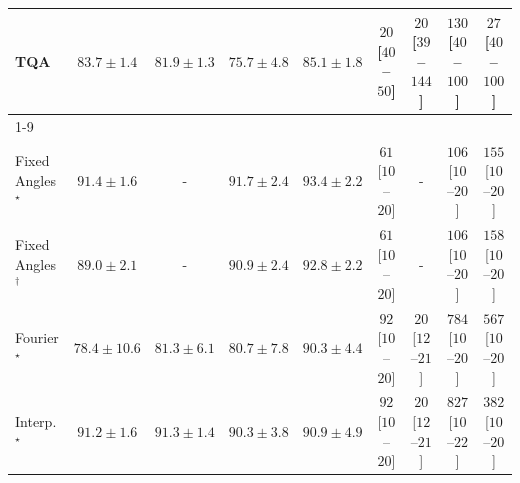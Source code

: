 \begin{tabular}{l|cccc|cccc|}
TQA & {\cellcolor[HTML]{1D7F41}} \color[HTML]{F1F1F1} $83.7\pm 1.4$ & {\cellcolor[HTML]{288A47}} \color[HTML]{F1F1F1} $81.9\pm 1.3$ & {\cellcolor[HTML]{53B466}} \color[HTML]{F1F1F1} $75.7\pm 4.8$ & {\cellcolor[HTML]{14783E}} \color[HTML]{F1F1F1} $85.1\pm 1.8$ & {\cellcolor[HTML]{FFF4F0}} \color[HTML]{000000} $20$ [$40$--$50$] & {\cellcolor[HTML]{FFF4F0}} \color[HTML]{000000} $20$ [$39$--$144$] & {\cellcolor[HTML]{FDDBD7}} \color[HTML]{000000} $130$ [$40$--$100$] & {\cellcolor[HTML]{FFF3EF}} \color[HTML]{000000} $27$ [$40$--$100$] \\
\cline{1-9}
\multicolumn{9}{c}{\rule{0pt}{8pt}SV} \\
\midrule
Fixed Angles$^\star$ & {\cellcolor[HTML]{03456C}} \color[HTML]{F1F1F1} $91.4\pm 1.6$ & {\cellcolor[HTML]{000000}} \color[HTML]{F1F1F1} {\cellcolor{white}} \color{black} - & {\cellcolor[HTML]{034369}} \color[HTML]{F1F1F1} $91.7\pm 2.4$ & {\cellcolor[HTML]{023858}} \color[HTML]{F1F1F1} $93.4\pm 2.2$ & {\cellcolor[HTML]{FEEBE8}} \color[HTML]{000000} $61$ [$10$--$20$] & {\cellcolor[HTML]{000000}} \color[HTML]{F1F1F1} {\cellcolor{white}} \color{black} - & {\cellcolor[HTML]{FDE1DE}} \color[HTML]{000000} $106$ [$10$--$20$] & {\cellcolor[HTML]{FDD4D0}} \color[HTML]{000000} $155$ [$10$--$20$] \\
Fixed Angles$^\dagger$ & {\cellcolor[HTML]{045483}} \color[HTML]{F1F1F1} $89.0\pm 2.1$ & {\cellcolor[HTML]{000000}} \color[HTML]{F1F1F1} {\cellcolor{white}} \color{black} - & {\cellcolor[HTML]{034871}} \color[HTML]{F1F1F1} $90.9\pm 2.4$ & {\cellcolor[HTML]{023B5D}} \color[HTML]{F1F1F1} $92.8\pm 2.2$ & {\cellcolor[HTML]{FEEBE8}} \color[HTML]{000000} $61$ [$10$--$20$] & {\cellcolor[HTML]{000000}} \color[HTML]{F1F1F1} {\cellcolor{white}} \color{black} - & {\cellcolor[HTML]{FDE1DE}} \color[HTML]{000000} $106$ [$10$--$20$] & {\cellcolor[HTML]{FDD3CF}} \color[HTML]{000000} $158$ [$10$--$20$] \\
Fourier$^\star$ & {\cellcolor[HTML]{2D8ABD}} \color[HTML]{F1F1F1} $78.4\pm 10.6$ & {\cellcolor[HTML]{1379B5}} \color[HTML]{F1F1F1} $81.3\pm 6.1$ & {\cellcolor[HTML]{187CB6}} \color[HTML]{F1F1F1} $80.7\pm 7.8$ & {\cellcolor[HTML]{034B76}} \color[HTML]{F1F1F1} $90.3\pm 4.4$ & {\cellcolor[HTML]{FDE4E1}} \color[HTML]{000000} $92$ [$10$--$20$] & {\cellcolor[HTML]{FFF4F0}} \color[HTML]{000000} $20$ [$12$--$21$] & {\cellcolor[HTML]{5D006F}} \color[HTML]{F1F1F1} $784$ [$10$--$20$] & {\cellcolor[HTML]{C71D8C}} \color[HTML]{F1F1F1} $567$ [$10$--$20$] \\
Interp.$^\star$ & {\cellcolor[HTML]{03466E}} \color[HTML]{F1F1F1} $91.2\pm 1.6$ & {\cellcolor[HTML]{03456C}} \color[HTML]{F1F1F1} $91.3\pm 1.4$ & {\cellcolor[HTML]{034B76}} \color[HTML]{F1F1F1} $90.3\pm 3.8$ & {\cellcolor[HTML]{034871}} \color[HTML]{F1F1F1} $90.9\pm 4.9$ & {\cellcolor[HTML]{FDE4E1}} \color[HTML]{000000} $92$ [$10$--$20$] & {\cellcolor[HTML]{FFF4F0}} \color[HTML]{000000} $20$ [$12$--$21$] & {\cellcolor[HTML]{49006A}} \color[HTML]{F1F1F1} $827$ [$10$--$22$] & {\cellcolor[HTML]{F87AA8}} \color[HTML]{F1F1F1} $382$ [$10$--$20$] \\

\end{tabular}
